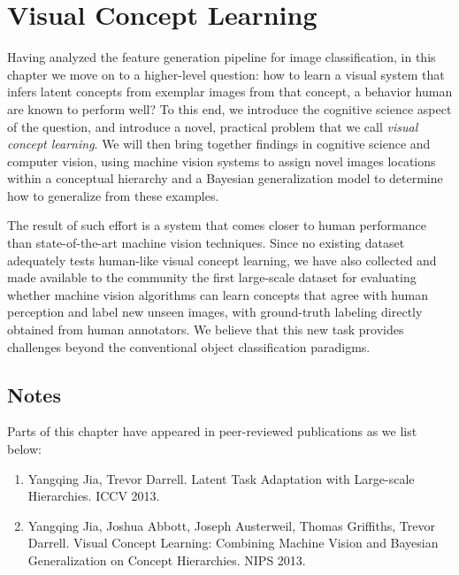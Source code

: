 \chapter{Visual Concept Learning}

Having analyzed the feature generation pipeline for image classification, in this chapter we move on to a higher-level question: how to learn a visual system that infers latent concepts from exemplar images from that concept, a behavior human are known to perform well? To this end, we introduce the cognitive science aspect of the question, and introduce a novel, practical problem that we call \emph{visual concept learning}. We will then bring together findings in cognitive science and computer vision, using machine vision systems to assign novel images locations within a conceptual hierarchy and a Bayesian generalization model to determine how to generalize from these examples.

The result of such effort is a system that comes closer to human performance than state-of-the-art machine vision techniques. Since no existing dataset adequately tests human-like visual concept learning, we have also collected and made available to the community the first large-scale dataset for evaluating whether machine vision algorithms can learn concepts that agree with human perception and label new unseen images, with ground-truth labeling directly obtained from human annotators. We believe that this new task provides challenges beyond the conventional object classification paradigms.



\section*{Notes}
Parts of this chapter have appeared in peer-reviewed publications as we list below:
\begin{enumerate}
\item Yangqing Jia, Trevor Darrell. Latent Task Adaptation with Large-scale Hierarchies. ICCV 2013.
\item Yangqing Jia, Joshua Abbott, Joseph Austerweil, Thomas Griffiths, Trevor Darrell. Visual Concept Learning: Combining Machine Vision and Bayesian Generalization on Concept Hierarchies. NIPS 2013.
\end{enumerate}